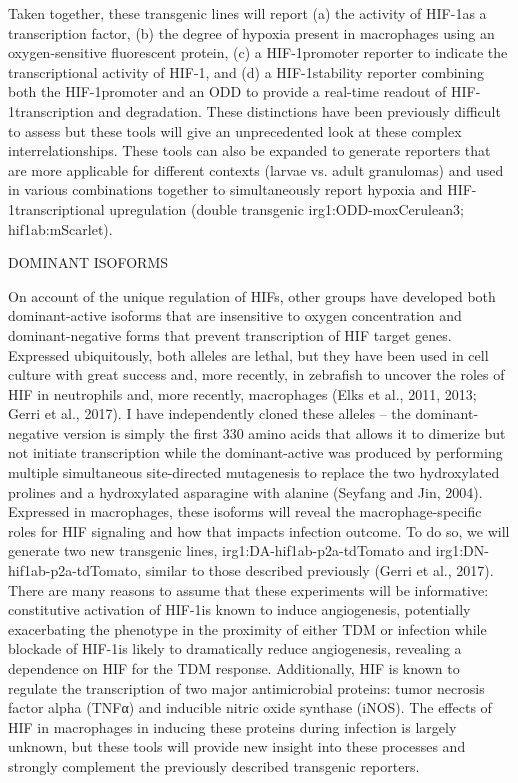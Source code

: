Taken together, these transgenic lines will report (a) the activity of HIF-1\textalpha as a transcription factor, (b) the degree of hypoxia present in macrophages using an oxygen-sensitive fluorescent protein, (c) a HIF-1\textalpha promoter reporter to indicate the transcriptional activity of HIF-1\textalpha, and (d) a HIF-1\textalpha stability reporter combining both the HIF-1\textalpha promoter and an ODD to provide a real-time readout of HIF-1\textalpha transcription and degradation. These distinctions have been previously difficult to assess but these tools will give an unprecedented look at these complex interrelationships. These tools can also be expanded to generate reporters that are more applicable for different contexts (larvae vs. adult granulomas) and used in various combinations together to simultaneously report hypoxia and HIF-1\textalpha transcriptional upregulation (double transgenic irg1:ODD-moxCerulean3; hif1ab:mScarlet).

DOMINANT ISOFORMS

On account of the unique regulation of HIFs, other groups have developed both dominant-active isoforms that are insensitive to oxygen concentration and dominant-negative forms that prevent transcription of HIF target genes. Expressed ubiquitously, both alleles are lethal, but they have been used in cell culture with great success and, more recently, in zebrafish to uncover the roles of HIF in neutrophils and, more recently, macrophages (Elks et al., 2011, 2013; Gerri et al., 2017). I have independently cloned these alleles – the dominant-negative version is simply the first 330 amino acids that allows it to dimerize but not initiate transcription while the dominant-active was produced by performing multiple simultaneous site-directed mutagenesis to replace the two hydroxylated prolines and a hydroxylated asparagine with alanine (Seyfang and Jin, 2004).
Expressed in macrophages, these isoforms will reveal the macrophage-specific roles for HIF signaling and how that impacts infection outcome. To do so, we will generate two new transgenic lines, irg1:DA-hif1ab-p2a-tdTomato and irg1:DN-hif1ab-p2a-tdTomato, similar to those described previously (Gerri et al., 2017). There are many reasons to assume that these experiments will be informative: constitutive activation of HIF-1\textalpha is known to induce angiogenesis, potentially exacerbating the phenotype in the proximity of either TDM or infection while blockade of HIF-1\textalpha is likely to dramatically reduce angiogenesis, revealing a dependence on HIF for the TDM response. Additionally, HIF is known to regulate the transcription of two major antimicrobial proteins: tumor necrosis factor alpha (TNFα) and inducible nitric oxide synthase (iNOS). The effects of HIF in macrophages in inducing these proteins during infection is largely unknown, but these tools will provide new insight into these processes and strongly complement the previously described transgenic reporters.  

